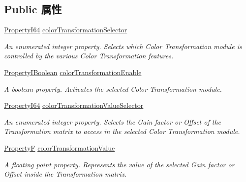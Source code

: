 \subsection*{Public 属性}
\begin{DoxyCompactItemize}
\item 
\hyperlink{group___common_interface_ga81749b2696755513663492664a18a893}{Property\+I64} \hyperlink{classmv_i_m_p_a_c_t_1_1acquire_1_1_gen_i_cam_1_1_color_transformation_control_a0f0956bfabf69ad85a2d2bbe3a91754c}{color\+Transformation\+Selector}
\begin{DoxyCompactList}\small\item\em An enumerated integer property. Selects which Color Transformation module is controlled by the various Color Transformation features. \end{DoxyCompactList}\item 
\hyperlink{group___common_interface_ga44f9437e24b21b6c93da9039ec6786aa}{Property\+I\+Boolean} \hyperlink{classmv_i_m_p_a_c_t_1_1acquire_1_1_gen_i_cam_1_1_color_transformation_control_a2f17dc0aa03f6221bf43bba751c87394}{color\+Transformation\+Enable}
\begin{DoxyCompactList}\small\item\em A boolean property. Activates the selected Color Transformation module. \end{DoxyCompactList}\item 
\hyperlink{group___common_interface_ga81749b2696755513663492664a18a893}{Property\+I64} \hyperlink{classmv_i_m_p_a_c_t_1_1acquire_1_1_gen_i_cam_1_1_color_transformation_control_acf4e51631a982d84b3e6df57be983457}{color\+Transformation\+Value\+Selector}
\begin{DoxyCompactList}\small\item\em An enumerated integer property. Selects the Gain factor or Offset of the Transformation matrix to access in the selected Color Transformation module. \end{DoxyCompactList}\item 
\hyperlink{group___common_interface_gaf54865fe5a3d5cfd15f9a111b40d09f9}{Property\+F} \hyperlink{classmv_i_m_p_a_c_t_1_1acquire_1_1_gen_i_cam_1_1_color_transformation_control_a20316b065654454864716f50f825c8d3}{color\+Transformation\+Value}
\begin{DoxyCompactList}\small\item\em A floating point property. Represents the value of the selected Gain factor or Offset inside the Transformation matrix. \end{DoxyCompactList}\end{DoxyCompactItemize}


